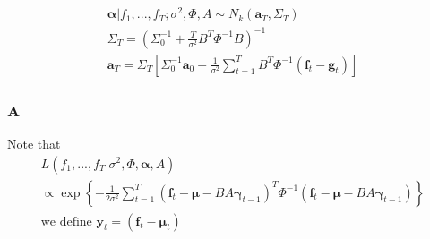 \begin{gather*}
    \boldsymbol{\alpha} | f_1, ..., f_T; \sigma^2, \Phi, A \sim N_k(\textbf{a}_T, \Sigma_T) \\
    \Sigma_T = (\Sigma_0^{-1} + \frac{T}{\sigma^2}B^T\Phi^{-1}B)^{-1} \\
    \textbf{a}_T = \Sigma_T \left[\Sigma_0^{-1}\textbf{a}_0 + \frac{1}{\sigma^2} \sum_{t=1}^T B^T \Phi^{-1}(\textbf{f}_t - \textbf{g}_t) \right]
\end{gather*}

\subsubsection{A}
Note that
\begin{gather*}
    L(f_1, ..., f_T | \sigma^2, \Phi, \boldsymbol{\alpha}, A) \\
    \propto \exp \left \{- \frac{1}{2 \sigma^2} \sum_{t=1}^T
    (\textbf{f}_t - \boldsymbol{\mu} - BA \boldsymbol{\gamma}_{t-1})^T \Phi^{-1}(\textbf{f}_t - \boldsymbol{\mu} - BA \boldsymbol{\gamma}_{t-1}) \right\} \\
    \text{we define $\textbf{y}_t = (\textbf{f}_t - \boldsymbol{\mu}_t)$} 
\end{gather*}

